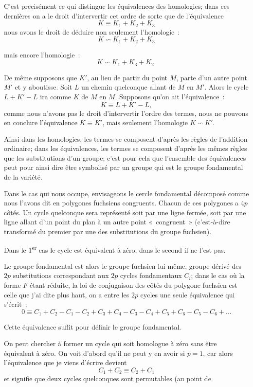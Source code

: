 \documentclass{article}
\begin{document}
C'est precisément ce qui distingue les équivalences des homologies; dans ces dernières on a le droit d'intervertir cet ordre de sorte que de l'équivalence
\[ K \equiv K_{1} + K_{2} + K_{3} \]
nous avons le droit de déduire non seulement l'homologie~:
\[ K \backsim K_{1} + K_{2} + K_{3} \]

mais encore l'homologie~:
\[ K \backsim K_{1} + K_{3} + K_{2}. \]

De même supposons que $K'$, au lieu de partir du point $M$, parte d'un autre point $M'$ et y aboutisse. Soit $L$ un chemin quelconque allant de $M$ en $M'$. Alors le cycle $L + K' - L$ ira comme $K$ de $M$ en $M$. Supposons qu'on ait l'équivalence~:
\[ K \equiv L + K' - L, \]
comme nous n'avons pas le droit d'intervertir l'ordre des termes, nous ne pouvons en conclure l'équivalence $K \equiv K'$, mais seulement l'homologie $K \backsim K'$.

Ainsi dans les homologies, les termes se composent d'après les règles de l'addition ordinaire; dans les équivalences, les termes se composent d'après les mêmes règles que les substitutions d'un groupe; c'est pour cela que l'ensemble des équivalences peut pour ainsi dire être symbolisé par un groupe qui est le groupe fondamental de la variété.

Dans le cas qui nous occupe, envisageons le cercle fondamental décomposé comme nous l'avons dit en polygones fuchsiens congruents. Chacun de ces polygones a $4p$ côtés. Un cycle quelconque sera représenté soit par une ligne fermée, soit par une ligne allant d'un point du plan à un autre point «~congruent~» (c'est-à-dire transformé du premier par une des substitutions du groupe fuchsien).

Dans le 1\textsuperscript{er} cas le cycle est équivalent à zéro, dans le second il ne l'est pas.

Le groupe fondamental est alors le groupe fuchsien lui-même, groupe dérivé des $2p$ substitutions correspondant aux $2p$ cycles fondamentaux $C_{i}$; dans le cas où la forme $F$ étant réduite, la loi de conjugaison des côtés du polygone fuchsien est celle que j'ai dite plus haut, on a entre les $2p$ cycles une seule équivalence qui s'écrit~:
\[ 0 \equiv C_{1} + C_{2} - C_{1} - C_{2} + C_{3} + C_{4} - C_{3} - C_{4} + C_{5} + C_{6} - C_{5} - C_{6} + \ldots \]

Cette équivalence suffit pour définir le groupe fondamental.

On peut chercher à former un cycle qui soit homologue à zéro sans être équivalent à zéro. On voit d'abord qu'il ne peut y en avoir si $p = 1$, car alors l'équivalence que je viens d'écrire devient
\[ C_{1} + C_{2} \equiv C_{2} + C_{1} \]
et signifie que deux cycles quelconques sont permutables (au point de
\end{document}
